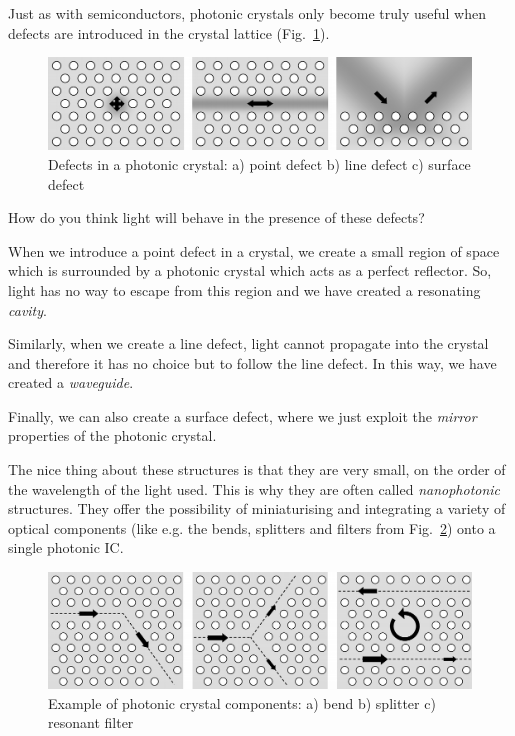 Just as with semiconductors, photonic crystals only become truly useful when defects are introduced in the crystal lattice (Fig.~\ref{fig-defects}).

\begin{figure}[H]
\centering
\includegraphics{symmetry/figures/2d_defects}
\caption{Defects in a photonic crystal: a) point defect b) line defect c) surface defect }
\label{fig-defects}
\end{figure}

\begin{cue}
  How do you think light will behave in the presence of these defects?
\end{cue}

When we introduce a point defect in a crystal, we create a small region of space which is surrounded by a photonic crystal which acts as a perfect reflector. So, light has no way to escape from this region and we have created a resonating \emph{cavity}.

Similarly, when we create a line defect, light cannot propagate into the crystal and therefore it has no choice but to follow the line defect. In this way, we have created a \emph{waveguide}.

Finally, we can also create a surface defect, where we just exploit the \emph{mirror} properties of the photonic crystal.

The nice thing about these structures is that they are very small, on the order of the wavelength of the light used. This is why they are often called \emph{nanophotonic} structures. They offer the possibility of miniaturising and integrating a variety of optical components (like e.g. the bends, splitters and filters from Fig.~\ref{fig-components}) onto a single photonic IC.

\begin{figure}
\centering
\includegraphics{symmetry/figures/2d_components}
\caption{Example of photonic crystal components: a) bend b) splitter c) resonant filter}
\label{fig-components}
\end{figure}



